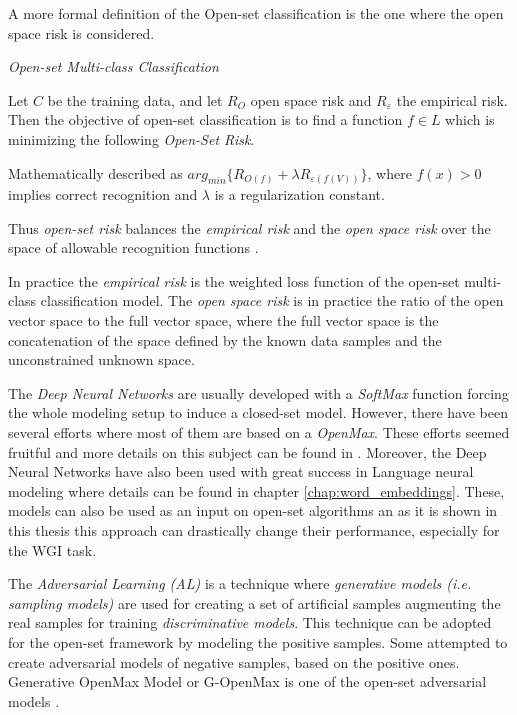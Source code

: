 A more formal definition of the Open-set classification is the one where the open space risk is considered.

\begin{definition}{\textit{Open-set Multi-class Classification}}

Let $C$ be the training data, and let $R_{O}$ open space risk and $R_{ε}$ the empirical risk. Then the objective of open-set classification is to find a function $f \in L$ which is minimizing the following \textit{Open-Set Risk}. 

Mathematically described as $arg_{min} \{R_{O(f )} + \lambda R_{ε (f (V ))}\}$, where $f (x) > 0$ implies correct recognition and $\lambda$ is a regularization constant.

Thus \textit{open-set risk} balances the \textit{empirical risk} and the \textit{open space risk} over the space of allowable recognition functions \parencite{geng2018recent}.

\end{definition}

In practice the \textit{empirical risk} is the weighted loss function of the open-set multi-class classification model. The \textit{open space risk} is in practice the ratio of the open vector space to the full vector space, where the full vector space is the concatenation of the space defined by the known data samples and the unconstrained unknown space.

The \textit{Deep Neural Networks} are usually developed with a \textit{SoftMax} function forcing the whole modeling setup to induce a closed-set model. However, there have been several efforts where most of them are based on a \textit{OpenMax}. These efforts seemed fruitful and more details on this subject can be found in \parencite{geng2018recent}. Moreover, the Deep Neural Networks have also been used with great success in Language neural modeling where details can be found in chapter \ref{chap:word_embeddings}. These, models can also be used as an input on open-set algorithms an as it is shown in this thesis this approach can drastically change their performance, especially for the WGI task.

The \textit{Adversarial Learning (AL)} is a technique where \textit{generative models (i.e. sampling models)} are used for creating a set of artificial samples augmenting the real samples for training \textit{discriminative models}. This technique can be adopted for the open-set framework by modeling the positive samples. Some attempted to create adversarial models of negative samples, based on the positive ones. Generative OpenMax Model or G-OpenMax is one of the open-set adversarial models \parencite{geng2018recent}.

